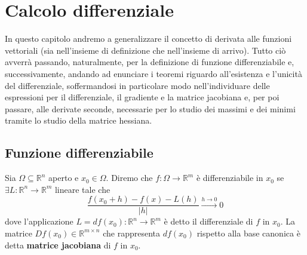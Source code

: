\chapter{Calcolo differenziale}

In questo capitolo andremo a generalizzare il concetto di derivata  alle funzioni vettoriali (sia nell'insieme di definizione che nell'insieme di arrivo). Tutto ciò avverrà passando, naturalmente, per la definizione di funzione differenziabile e, successivamente, andando ad enunciare i teoremi riguardo all'esistenza e l'unicità del differenziale, soffermandosi in particolare modo nell'individuare delle espressioni per il differenziale, il gradiente e la matrice jacobiana e, per poi passare, alle derivate seconde, necessarie per lo studio dei massimi e dei minimi tramite lo studio della matrice hessiana. 

\section{Funzione differenziabile}

\begin{definition}
Sia $\Omega \subseteq \mathbb{R}^n$ aperto e $x_0 \in \Omega$. Diremo che $f: \Omega \to \mathbb{R}^m$ è differenziabile in $x_0$ se $\exists L: \mathbb{R}^n \to \mathbb{R}^m$ lineare tale che
$$
\frac{f(x_0 + h)-f(x) - L(h)}{|h|} \stackrel{h \to 0}{\to} 0
$$
dove l'applicazione $L = df(x_0): \mathbb{R}^n \to \mathbb{R}^m$ è detto il differenziale di $f$ in $x_0$. La matrice $Df(x_0) \in \mathbb{R}^{m \times n}$ che rappresenta $df(x_0)$ rispetto alla base canonica è detta \textbf{matrice jacobiana} di $f$ in $x_0$.
\end{definition}

